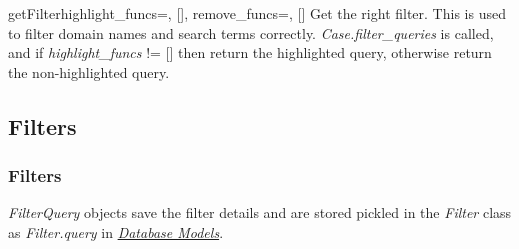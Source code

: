 \documentclass[letterpaper,10pt,english]{manual}
\begin{document}
\hypertarget{webscavator.model.models.getFilter}{}\begin{funcdesc}{getFilter}{highlight\_funcs=, {[}{]}, remove\_funcs=, {[}{]}}
Get the right filter. This is used to filter domain names and search terms correctly.
\emph{Case.filter\_queries} is called, and if \emph{highlight\_funcs} != {[}{]} then return
the highlighted query, otherwise return the non-highlighted query.
\end{funcdesc}

\resetcurrentobjects
\hypertarget{--doc-filters}{}

\subsection{Filters}
\hypertarget{module-webscavator.model.filters}{}
\modulesynopsis{}

\subsubsection{Filters}

\emph{FilterQuery} objects save the filter details and are stored pickled in the \emph{Filter} class as
\emph{Filter.query} in \hyperlink{--doc-models}{\emph{Database Models}}.
\end{document}
